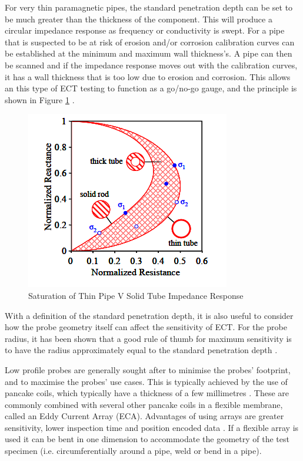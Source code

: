 \documentclass[a4paper,twoside,11pt]{article}
\begin{document}
For very thin paramagnetic pipes, the standard penetration depth can be set to be much greater than the thickness of the component.
This will produce a circular impedance response as frequency or conductivity is swept. 
For a pipe that is suspected to be at risk of erosion and/or corrosion calibration curves can be established at the minimum and maximum wall thickness's. 
A pipe can then be scanned and if the impedance response moves out with the calibration curves, it has a wall thickness that is too low due to erosion and corrosion. 
This allows an this type of ECT testing to function as a go/no-go gauge, and the principle is shown in Figure \ref{Saturation} \cite{nagyElectromagneticNDE2019}.

\begin{figure}[h]
	\includegraphics[width=0.4\linewidth]{images/Capture5.png}
	\centering
	\caption{Saturation of Thin Pipe V Solid Tube Impedance Response \cite{nagyElectromagneticNDE2019}}
	\label{Saturation}
\end{figure}
With a definition of the standard penetration depth, it is also useful to consider how the probe geometry itself can affect the sensitivity of ECT. 
For the probe radius, it has been shown that a good rule of thumb for maximum sensitivity is to have the radius approximately equal to the standard penetration depth \cite{nagyElectromagneticNDE2019}. 

Low profile probes are generally sought after to minimise the probes' footprint, and to maximise the probes' use cases. 
This is typically achieved by the use of pancake coils, which typically have a thickness of a few millimetres \cite{haikemetalPancakeCoilHaiKe}. 
These are commonly combined with several other pancake coils in a flexible membrane, called an Eddy Current Array (ECA). 
Advantages of using arrays are greater sensitivity, lower inspection time and position encoded data \cite{olympusEddyCurrentArray}. 
If a flexible array is used it can be bent in one dimension to accommodate the geometry of the test specimen (i.e. circumferentially around a pipe, weld or bend in a pipe).
\end{document}
